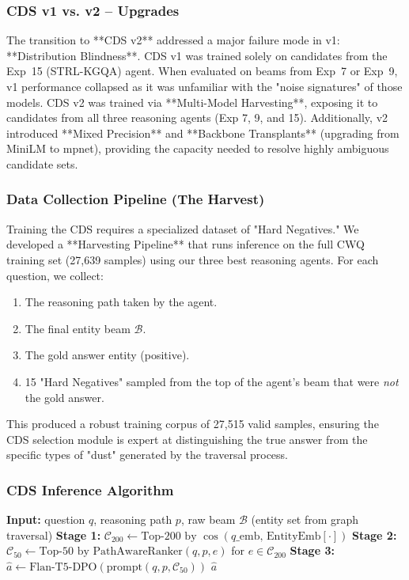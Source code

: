 \documentclass[11pt,a4paper]{article}
\newcommand{\STRL}{\textsc{STRL-KGQA}}
\begin{document}
\subsubsection{CDS v1 vs. v2 -- Upgrades}
The transition to **CDS v2** addressed a major failure mode in v1:
**Distribution Blindness**.
CDS v1 was trained solely on candidates from the Exp~15 (\STRL{}) agent.
When evaluated on beams from Exp~7 or Exp~9, v1 performance collapsed as it
was unfamiliar with the "noise signatures" of those models.
CDS v2 was trained via **Multi-Model Harvesting**, exposing it to candidates
from all three reasoning agents (Exp 7, 9, and 15). 
Additionally, v2 introduced **Mixed Precision** and **Backbone Transplants**
(upgrading from MiniLM to mpnet), providing the capacity needed to resolve
highly ambiguous candidate sets.

\subsubsection{Data Collection Pipeline (The Harvest)}
Training the CDS requires a specialized dataset of "Hard Negatives." We
developed a **Harvesting Pipeline** that runs inference on the full CWQ
training set (27,639 samples) using our three best reasoning agents.
For each question, we collect:
\begin{enumerate}
    \item The reasoning path taken by the agent.
    \item The final entity beam $\mathcal{B}$.
    \item The gold answer entity (positive).
    \item 15 "Hard Negatives" sampled from the top of the agent's beam that
          were \emph{not} the gold answer.
\end{enumerate}
This produced a robust training corpus of 27,515 valid samples, ensuring the
CDS selection module is expert at distinguishing the true answer from the
specific types of "dust" generated by the traversal process.

\subsubsection{CDS Inference Algorithm}
\begin{algorithm}
\caption{Cascading Dust Separator -- Inference}
\label{alg:cds}
\begin{algorithmic}[1]
    \State \textbf{Input:} question $q$, reasoning path $p$,
           raw beam $\mathcal{B}$ (entity set from graph traversal)
    \State \textbf{Stage 1:}
           $\mathcal{C}_{200} \gets \text{Top-200 by }
           \cos(q\_\text{emb},\,\text{EntityEmb}[\cdot])$ 
    \State \textbf{Stage 2:}
           $\mathcal{C}_{50} \gets \text{Top-50 by }
           \text{PathAwareRanker}(q, p, e)$ for $e \in \mathcal{C}_{200}$
    \State \textbf{Stage 3:}
           $\hat{a} \gets \text{Flan-T5-DPO}\left( \text{prompt}(q, p, \mathcal{C}_{50}) \right)$
    \State \Return $\hat{a}$
\end{algorithmic}
\end{algorithm}
\end{document}

